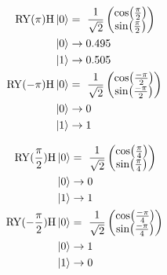 \begin{equation}
    \centering
    \begin{split}
        \mathrm{RY}(\pi)\mathrm{H}\ket{0} &=\ \frac{1}{\sqrt{2}}\begin{pmatrix}\cos(\frac{\pi}{2}) \\ \sin(\frac{\pi}{2})\end{pmatrix}\\
        \ket{0} &\to 0.495 \\
        \ket{1} &\to 0.505 \\
        \mathrm{RY}(-\pi)\mathrm{H}\ket{0} &=\ \frac{1}{\sqrt{2}}\begin{pmatrix}\cos(\frac{-\pi}{2}) \\ \sin(\frac{-\pi}{2})\end{pmatrix}\\
        \ket{0} &\to 0 \\
        \ket{1} &\to 1 \\
    \end{split}
    \label{equation:normalization_range_pi}
\end{equation}

\begin{equation}
    \centering
    \begin{split}
        \mathrm{RY}(\frac{\pi}{2})\mathrm{H}\ket{0} &=\ \frac{1}{\sqrt{2}}\begin{pmatrix}\cos(\frac{\pi}{4}) \\ \sin(\frac{\pi}{4})\end{pmatrix}\\
        \ket{0} &\to 0 \\
        \ket{1} &\to 1 \\
        \mathrm{RY}(-\frac{\pi}{2})\mathrm{H}\ket{0} &=\ \frac{1}{\sqrt{2}}\begin{pmatrix}\cos(\frac{-\pi}{4}) \\ \sin(\frac{-\pi}{4})\end{pmatrix}\\
        \ket{0} &\to 1 \\
        \ket{1} &\to 0 \\
    \end{split}
    \label{equation:normalization_range_half_pi}
\end{equation}

